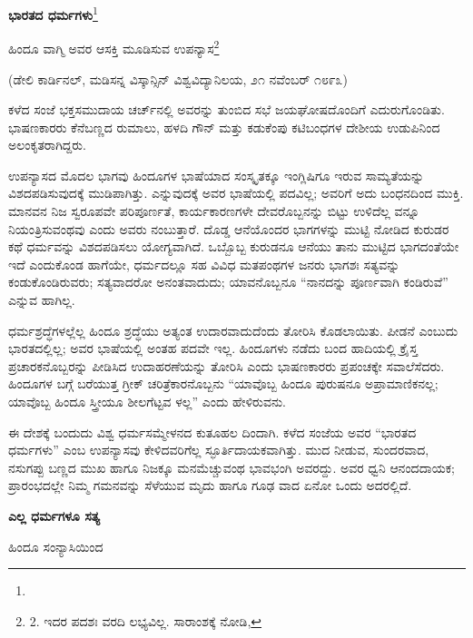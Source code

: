 \begin{center}
\textbf{ಭಾರತದ ಧರ್ಮಗಳು}\footnote{}
\end{center}

\begin{center}
ಹಿಂದೂ ವಾಗ್ಮಿ  ಅವರ ಆಸಕ್ತಿ ಮೂಡಿಸುವ ಉಪನ್ಯಾಸ\footnote{2. ಇದರ ಪದಶಃ ವರದಿ ಲಭ್ಯವಿಲ್ಲ. ಸಾರಾಂಶಕ್ಕೆ ನೋಡಿ, }
\end{center}

(ಡೇಲಿ ಕಾರ್ಡಿನಲ್, ಮಡಿಸನ್ನ ವಿಸ್ಕಾನ್ಸಿನ್ ವಿಶ್ವವಿದ್ಯಾನಿಲಯ, ೨೧ ನವೆಂಬರ್ ೧೮೯೩)

ಕಳೆದ ಸಂಜೆ ಭಕ್ತಸಮುದಾಯ ಚರ್ಚ್​ನಲ್ಲಿ  ಅವರನ್ನು ತುಂಬಿದ ಸಭೆ ಜಯಘೋಷದೊಂದಿಗೆ ಎದುರುಗೊಂಡಿತು. ಭಾಷಣಕಾರರು ಕೆನೆಬಣ್ಣದ ರುಮಾಲು, ಹಳದಿ ಗೌನ್ ಮತ್ತು ಕಡುಕೆಂಪು ಕಟಿಬಂಧಗಳ ದೇಶೀಯ ಉಡುಪಿನಿಂದ ಅಲಂಕೃತರಾಗಿದ್ದರು.

ಉಪನ್ಯಾಸದ ಮೊದಲ ಭಾಗವು ಹಿಂದೂಗಳ ಭಾಷೆಯಾದ ಸಂಸ್ಕೃತಕ್ಕೂ ಇಂಗ್ಲಿಷಿಗೂ ಇರುವ ಸಾಮ್ಯತೆಯನ್ನು ವಿಶದಪಡಿಸುವುದಕ್ಕೆ ಮುಡಿಪಾಗಿತ್ತು.  ಎನ್ನುವುದಕ್ಕೆ ಅವರ ಭಾಷೆಯಲ್ಲಿ ಪದವಿಲ್ಲ; ಅವರಿಗೆ ಅದು ಬಂಧನದಿಂದ ಮುಕ್ತಿ. ಮಾನವನ ನಿಜ ಸ್ವರೂಪವೇ ಪರಿಪೂರ್ಣತೆ, ಕಾರ್ಯಕಾರಣಗಳೇ ದೇವರೊಬ್ಬನನ್ನು ಬಿಟ್ಟು ಉಳಿದೆಲ್ಲ ವನ್ನೂ ನಿಯಂತ್ರಿಸುವಂಥವು ಎಂದು ಅವರು ನಂಬುತ್ತಾರೆ. ದೊಡ್ಡ ಆನೆಯೊಂದರ ಭಾಗಗಳನ್ನು ಮುಟ್ಟಿ ನೋಡಿದ ಕುರುಡರ ಕಥೆ ಧರ್ಮವನ್ನು ವಿಶದಪಡಿಸಲು ಯೋಗ್ಯವಾಗಿದೆ. ಒಬ್ಬೊಬ್ಬ ಕುರುಡನೂ ಆನೆಯು ತಾನು ಮುಟ್ಟಿದ ಭಾಗದಂತೆಯೇ ಇದೆ ಎಂದುಕೊಂಡ ಹಾಗೆಯೇ, ಧರ್ಮದಲ್ಲೂ ಸಹ ವಿವಿಧ ಮತಪಂಥಗಳ ಜನರು ಭಾಗಶಃ ಸತ್ಯವನ್ನು ಕಂಡುಕೊಂಡಿರುವರು; ಸತ್ಯವಾದರೋ ಅನಂತವಾದುದು; ಯಾವನೊಬ್ಬನೂ “ನಾನದನ್ನು ಪೂರ್ಣವಾಗಿ ಕಂಡಿರುವೆ” ಎನ್ನುವ ಹಾಗಿಲ್ಲ.

ಧರ್ಮಶ್ರದ್ಧೆಗಳಲ್ಲೆಲ್ಲ ಹಿಂದೂ ಶ್ರದ್ಧೆಯು ಅತ್ಯಂತ ಉದಾರವಾದುದೆಂದು ತೋರಿಸಿ ಕೊಡಲಾಯಿತು. ಪೀಡನೆ ಎಂಬುದು ಭಾರತದಲ್ಲಿಲ್ಲ; ಅವರ ಭಾಷೆಯಲ್ಲಿ ಅಂತಹ ಪದವೇ ಇಲ್ಲ. ಹಿಂದೂಗಳು ನಡೆದು ಬಂದ ಹಾದಿಯಲ್ಲಿ ಕ್ರೈಸ್ತ ಪ್ರಚಾರಕನೊಬ್ಬರನ್ನು ಪೀಡಿಸಿದ ಉದಾಹರಣೆಯನ್ನು ತೋರಿಸಿ ಎಂದು ಭಾಷಣಕಾರರು ಪ್ರಪಂಚಕ್ಕೇ ಸವಾಲೆಸೆದರು. ಹಿಂದೂಗಳ ಬಗ್ಗೆ ಬರೆಯುತ್ತ ಗ್ರೀಕ್ ಚರಿತ್ರೆಕಾರನೊಬ್ಬನು “ಯಾವೊಬ್ಬ ಹಿಂದೂ ಪುರುಷನೂ ಅಪ್ರಾಮಾಣಿಕನಲ್ಲ; ಯಾವೊಬ್ಬ ಹಿಂದೂ ಸ್ತ್ರೀಯೂ ಶೀಲಗೆಟ್ಟವ ಳಲ್ಲ” ಎಂದು ಹೇಳಿರುವನು.

 ಈ ದೇಶಕ್ಕೆ ಬಂದುದು ವಿಶ್ವ ಧರ್ಮಸಮ್ಮೇಳನದ ಕುತೂಹಲ ದಿಂದಾಗಿ. ಕಳೆದ ಸಂಜೆಯ ಅವರ “ಭಾರತದ ಧರ್ಮಗಳು” ಎಂಬ ಉಪನ್ಯಾಸವು ಕೇಳಿದವರಿಗೆಲ್ಲ ಸ್ಫೂರ್ತಿದಾಯಕವಾಗಿತ್ತು. ಮುದ ನೀಡುವ, ಸುಂದರವಾದ, ನಸುಗಪ್ಪು ಬಣ್ಣದ ಮುಖ ಹಾಗೂ ನಿಜಕ್ಕೂ ಮನಮೆಚ್ಚುವಂಥ ಭಾವಭಂಗಿ ಅವರದ್ದು. ಅವರ ಧ್ವನಿ ಆನಂದದಾಯಕ; ಪ್ರಾರಂಭದಲ್ಲೇ ನಿಮ್ಮ ಗಮನವನ್ನು ಸೆಳೆಯುವ ಮೃದು ಹಾಗೂ ಗೂಢ ವಾದ ಏನೋ ಒಂದು ಅದರಲ್ಲಿದೆ.

\begin{center}
\textbf{ಎಲ್ಲ ಧರ್ಮಗಳೂ ಸತ್ಯ}
\end{center}

\begin{center}
ಹಿಂದೂ ಸಂನ್ಯಾಸಿಯಿಂದ
\end{center}

